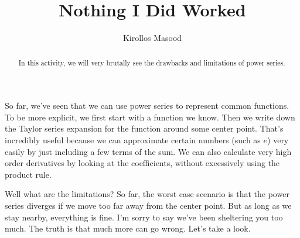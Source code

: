 \documentclass{ximera}
\title{Nothing I Did Worked}
\author{Kirollos Masood}
\begin{document}
\begin{abstract}
In this activity, we will very brutally see the drawbacks and limitations of power series.
\end{abstract}
\maketitle

So far, we've seen that we can use power series to represent common functions. To be more explicit, we first start with a function we know. Then we write down the Taylor series expansion for the function around some center point. That's incredibly useful because we can approximate certain numbers (such as $e$) very easily by just including a few terms of the sum. We can also calculate very high order derivatives by looking at the coefficients, without excessively using the product rule.

Well what are the limitations? So far, the worst case scenario is that the power series diverges if we move too far away from the center point. But as long as we stay nearby, everything is fine. I'm sorry to say we've been sheltering you too much. The truth is that much more can go wrong. Let's take a look.
\end{document}
